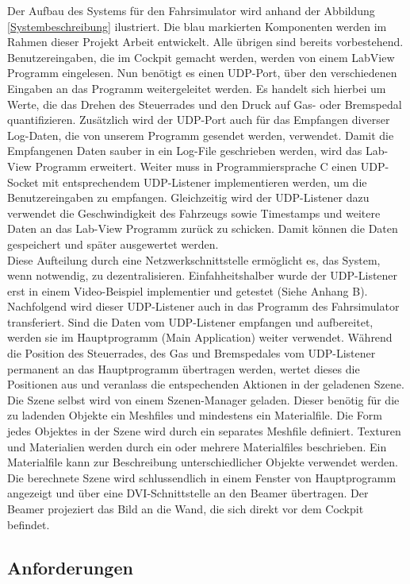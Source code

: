 Der Aufbau des Systems für den Fahrsimulator wird anhand der Abbildung \ref{Systembeschreibung} ilustriert. Die blau markierten Komponenten werden im Rahmen dieser Projekt Arbeit entwickelt. Alle übrigen sind bereits vorbestehend. 
Benutzereingaben, die im Cockpit gemacht werden, werden von einem LabView Programm eingelesen. Nun benötigt es einen UDP-Port,  über den verschiedenen Eingaben an das Programm weitergeleitet werden. Es handelt sich hierbei um Werte, die das Drehen des Steuerrades und den Druck auf Gas- oder Bremspedal quantifizieren. Zusätzlich wird der UDP-Port auch für das Empfangen diverser Log-Daten, die von unserem Programm gesendet werden, verwendet. Damit die Empfangenen Daten sauber in ein Log-File geschrieben werden, wird das Lab-View Programm erweitert. 
Weiter  muss in Programmiersprache C einen UDP-Socket mit entsprechendem UDP-Listener implementieren werden, um die Benutzereingaben zu empfangen. Gleichzeitig wird der UDP-Listener dazu verwendet die Geschwindigkeit des Fahrzeugs sowie Timestamps und weitere Daten an das Lab-View Programm zurück zu schicken. Damit können die Daten gespeichert und später ausgewertet werden.
\\
Diese Aufteilung durch eine Netzwerkschnittstelle ermöglicht es,  das System, wenn notwendig, zu dezentralisieren. Einfahheitshalber wurde der UDP-Listener erst in einem Video-Beispiel implementier und getestet (Siehe Anhang B). Nachfolgend wird dieser UDP-Listener auch in das Programm des Fahrsimulator transferiert.
Sind die Daten vom UDP-Listener empfangen und aufbereitet, werden sie im Hauptprogramm (Main Application) weiter verwendet. Während die Position des Steuerrades, des Gas und Bremspedales vom UDP-Listener permanent an das Hauptprogramm übertragen werden, wertet dieses die Positionen aus und veranlass die entspechenden Aktionen in der geladenen Szene. 
Die Szene selbst wird von einem Szenen-Manager geladen. Dieser benötig für die zu ladenden Objekte ein Meshfiles und mindestens ein Materialfile. Die Form jedes Objektes in der Szene wird durch ein separates Meshfile definiert. Texturen und Materialien werden durch ein oder mehrere Materialfiles beschrieben. Ein Materialfile kann zur Beschreibung unterschiedlicher Objekte verwendet werden. Die berechnete Szene wird schlussendlich in einem Fenster von Hauptprogramm angezeigt und über eine DVI-Schnittstelle an den Beamer übertragen. Der Beamer projeziert das Bild an die Wand, die sich direkt vor dem Cockpit befindet. 

\subsection{Anforderungen}
